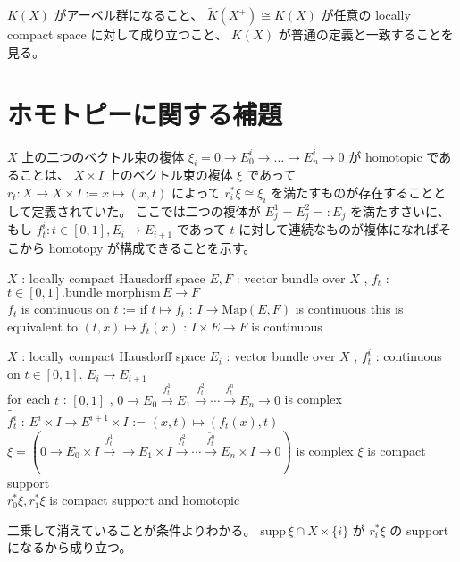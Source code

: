 \documentclass[dvipdfmx]{jsarticle}
\begin{document}
\(K(X)\) がアーベル群になること、 \(\tilde{K}(X^{+}) \cong K(X)\) が任意の locally compact space に対して成り立つこと、 \(K(X)\) が普通の定義と一致することを見る。

\section{ホモトピーに関する補題}
\(X\) 上の二つのベクトル束の複体 \(\xi_i = 0 \to E^i_0 \to \ldots \to E^i_n \to 0\) が homotopic であることは、 \(X \times I\) 上のベクトル束の複体 \(\xi\) であって \(r_t : X \to X \times I := x \mapsto (x , t)\) によって \(r_i^* \xi \cong \xi_i\) を満たすものが存在することとして定義されていた。
ここでは二つの複体が \(E^1_j = E^2_j =: E_j\) を満たすさいに、 もし \(f_t^i : t \in [0,1] , E_i \to E_{i+1}\) であって \(t\) に対して連続なものが複体になればそこから homotopy が構成できることを示す。

\begin{Definition}
\itemwhen
  \Fix \(X\) : locally compact Hausdorff space
\itemdefi
  \For \(E , F\) : vector bundle over \(X\) , \(f_t\) : \(t \in [0,1] . \text{bundle morphism} \, E \to F\) \\
  \Define \(f_t\) is continuous on \(t\) := if \(t \mapsto f_t\) : \(I \to \text{Map}(E,F)\) is continuous
\itemprop
  \Then this is equivalent to \((t , x) \mapsto f_t(x)\) : \(I \times E \to F\) is continuous
\end{Definition}

\begin{Theorem}
\itemwhen
  \Fix \(X\) : locally compact Hausdorff space
\itemprop
  \For \(E_i\) : vector bundle over \(X\) , \(f^i_t\) : continuous on \(t \in [0,1]\). \(E_i \to E_{i+1}\) \\
  \IfHold for each \(t\) : \([0,1]\) , \(0 \to E_0 \overset{f^1_t}{\to} E_1 \overset{f^2_t}{\to} \cdots \overset{f^n_t}{\to} E_n \to 0\) is complex \\
  \Let \(\tilde{f^i_t}\) : \(E^i \times I \to E^{i+1} \times I\) := \((x,t) \mapsto (f_t(x) , t)\) \\
  \Then \(\xi = (0 \to E_0 \times I \overset{\tilde{f^1_t}}{\to} \to E_1 \times I \overset{\tilde{f^2_t}}{\to} \cdots \overset{\tilde{f^n_t}}{\to} E_n \times I \to 0)\) is complex
\itemprop
  \IfHold \(\xi\) is compact support \\
  \Then \(r_0^* \xi , r_1^* \xi\) is compact support and homotopic
\end{Theorem}

\begin{Proof}
\itemprof
  二乗して消えていることが条件よりわかる。
\itemprof
  \(\text{supp} \, \xi \cap X \times \{i\}\) が \(r_i^* \xi\) の support になるから成り立つ。
\end{Proof}
\end{document}
